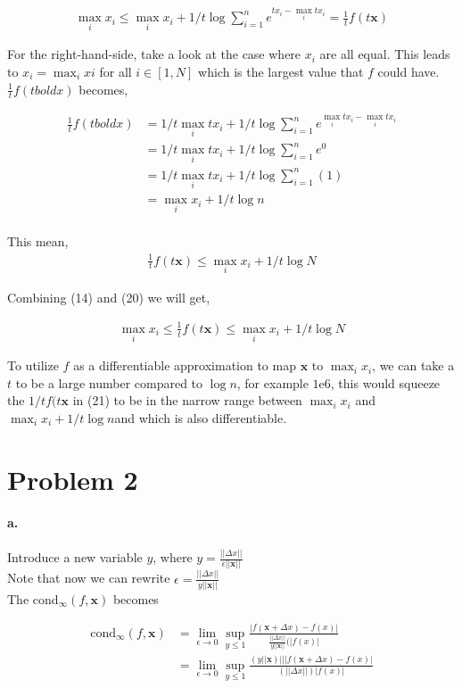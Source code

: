 \documentclass{scrartcl}
\begin{document}
\begin{align}
\max_{i}x_i \leq \max_ix_i + 1/t\log\sum_{i=1}^{n} e^{tx_i-\max_itx_i} = \frac{1}{t}f(t\mathbf{x})
\end{align}

For the right-hand-side, take a look at the case where $x_i$ are all equal. This leads to $x_i = \max_ixi$ for all $i \in [1,N]$ which is the largest value that $f$ could have. $\frac{1}{t} f(t{bold{x}})$ becomes, 

\begin{align}
\frac{1}{t} f(t{bold{x}})
&=1/t\max_itx_i + 1/t\log\sum_{i=1}^{n} e^{\max_itx_i-\max_itx_i}\\
&=1/t\max_itx_i + 1/t\log\sum_{i=1}^{n} e^{0}\\
&=1/t\max_itx_i + 1/t\log\sum_{i=1}^{n} (1)\\
&=\max_ix_i + 1/t\log n\\
\end{align}

This mean, 
\begin{align}
\frac{1}{t}f(t\mathbf{x}) \leq \max_ix_i + 1/t\log N
\end{align}

Combining (14) and (20) we will get, 

\begin{align}
\max_{i}x_i \leq \frac{1}{t}f(t\mathbf{x})  \leq \max_ix_i + 1/t\log N
\end{align}

To utilize $f$ as a differentiable approximation to map $\mathbf{x}$ to $\max_ix_i$, we can take a $t$ to be a large number compared to $\log n$, for example $1\mathrm{e}{6}$, this would squeeze the $1/tf(t\mathbf{x}$ in (21) to be in the narrow range between $\max_ix_i$ and $\max_ix_i + 1/t\log n $and which is also differentiable.

\section*{Problem 2}
\paragraph{a.}
Introduce a new variable $y$, where $y = \frac{||\Delta x||}{\epsilon||\mathbf{x}||}$ \\
Note that now we can rewrite $\epsilon = \frac{||\Delta x||}{y||\mathbf{x}||}$\\
The cond$_\infty (f,\mathbf{x})$ becomes 

\begin{align}
\textrm{cond}_\infty (f,\mathbf{x}) 
&= \lim\limits_{\epsilon \rightarrow 0}\sup_{y \leq 1} \frac{|f(\mathbf{x}+ \Delta x) - f(x)|}{\frac{||\Delta x||}{y||\mathbf{x}||}(|f(x)|}\\
&=\lim\limits_{\epsilon \rightarrow 0}\sup_{y \leq 1} \frac{(y||\mathbf{x})|| |f(\mathbf{x}+ \Delta x) - f(x)|}{(||\Delta x||) |f(x)|}
\end{align}
\\ \\ \\ \\
\end{document}
